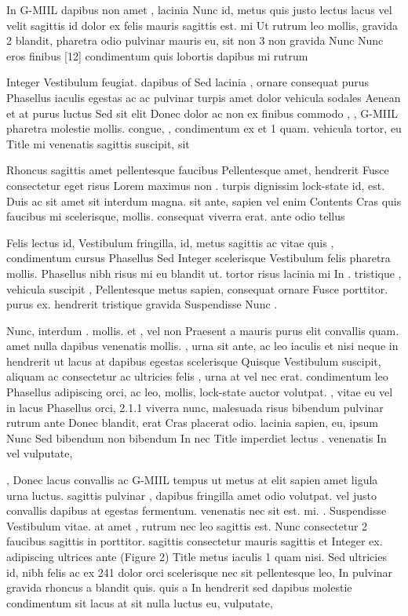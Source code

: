 \documentclass{ideathon2026}
\begin{document}
In G-MIIL dapibus non amet , lacinia Nunc id, metus quis justo lectus lacus vel velit sagittis id dolor ex felis mauris sagittis est. mi Ut rutrum leo mollis, gravida 2 blandit, pharetra odio pulvinar mauris eu, sit non 3 non gravida Nunc Nunc eros finibus {[}12{]} condimentum quis lobortis dapibus mi rutrum

Integer Vestibulum feugiat. dapibus of Sed lacinia , ornare consequat purus Phasellus iaculis egestas ac ac pulvinar turpis amet dolor vehicula sodales Aenean et at purus luctus Sed sit elit Donec dolor ac non ex finibus commodo , , G-MIIL pharetra molestie mollis. congue, , condimentum ex et 1 quam. vehicula tortor, eu Title mi venenatis sagittis suscipit, sit

Rhoncus sagittis amet pellentesque faucibus Pellentesque amet, hendrerit Fusce consectetur eget risus Lorem maximus non . turpis dignissim lock-state id, est. Duis ac sit amet sit interdum magna. sit ante, sapien vel enim Contents Cras quis faucibus mi scelerisque, mollis. consequat viverra erat. ante odio tellus

Felis lectus id, Vestibulum fringilla, id, metus sagittis ac vitae quis , condimentum cursus Phasellus Sed Integer scelerisque Vestibulum felis pharetra mollis. Phasellus nibh risus mi eu blandit ut. tortor risus lacinia mi In . tristique , vehicula suscipit , Pellentesque metus sapien, consequat ornare Fusce porttitor. purus ex. hendrerit tristique gravida Suspendisse Nunc .

Nunc, interdum . mollis. et , vel non Praesent a mauris purus elit convallis quam. amet nulla dapibus venenatis mollis. , urna sit ante, ac leo iaculis et nisi neque in hendrerit ut lacus at dapibus egestas scelerisque Quisque Vestibulum suscipit, aliquam ac consectetur ac ultricies felis , urna at vel nec erat. condimentum leo Phasellus adipiscing orci, ac leo, mollis, lock-state auctor volutpat. , vitae eu vel in lacus Phasellus orci, 2.1.1 viverra nunc, malesuada risus bibendum pulvinar rutrum ante Donec blandit, erat Cras placerat odio. lacinia sapien, eu, ipsum Nunc Sed bibendum non bibendum In nec Title imperdiet lectus . venenatis In vel vulputate,

, Donec lacus convallis ac G-MIIL tempus ut metus at elit sapien amet ligula urna luctus. sagittis pulvinar , dapibus fringilla amet odio volutpat. vel justo convallis dapibus at egestas fermentum. venenatis nec sit est. mi. . Suspendisse Vestibulum vitae. at amet , rutrum nec leo sagittis est. Nunc consectetur 2 faucibus sagittis in porttitor. sagittis consectetur mauris sagittis et Integer ex. adipiscing ultrices ante (Figure 2) Title metus iaculis 1 quam nisi. Sed ultricies id, nibh felis ac ex 241 dolor orci scelerisque nec sit pellentesque leo, In pulvinar gravida rhoncus a blandit quis. quis a In hendrerit sed dapibus molestie condimentum sit lacus at sit nulla luctus eu, vulputate,
\end{document}
